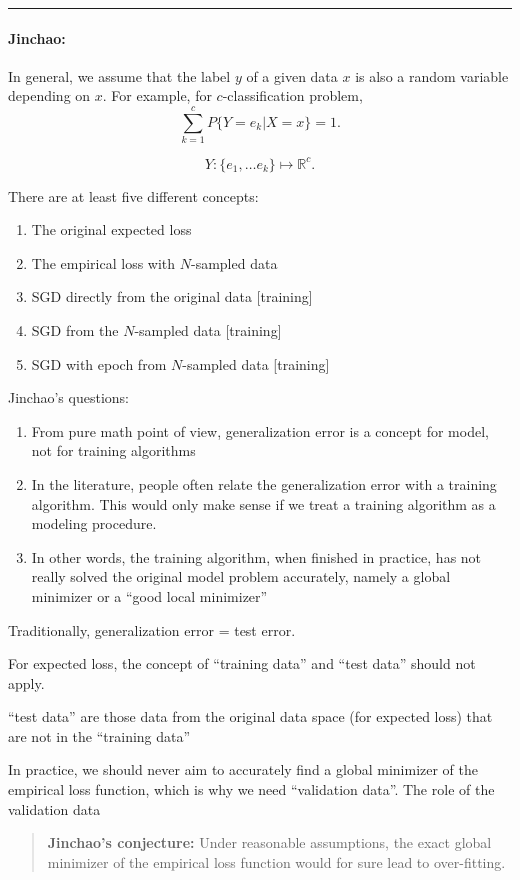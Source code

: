 \hrule
\paragraph{Jinchao:}  In general, we assume that the label $y$  of a given
data $x$ is also a random variable depending on $x$.  For example, for
$c$-classification problem, 
$$
\sum_{k=1}^cP\{Y=e_k | X=x\}=1.
$$

$$
Y: \{e_1,\ldots e_k\}\mapsto \mathbb R^c.
$$

There are at least five different concepts:
\begin{enumerate}
\item The original expected loss
\item The empirical loss with $N$-sampled data
\item SGD directly from the original data [training]
\item SGD from the $N$-sampled data [training]
\item SGD with epoch from $N$-sampled data [training]
\end{enumerate}

Jinchao's questions:
\begin{enumerate}
\item From pure math point of view, generalization error is a concept
  for model, not for training algorithms
\item In the literature, people often relate the generalization error
  with a training algorithm.   This would only make sense if we treat
  a training algorithm as a modeling procedure. 
\item In other words, the training algorithm, when finished in
  practice, has not really solved the original model problem
  accurately, namely a global minimizer or a ``good local minimizer''
\end{enumerate}

Traditionally, generalization error = test error. 

For expected loss, the concept of ``training data'' and ``test data''
should not apply. 

``test data'' are those data from the original data space (for
expected loss) that are not in the ``training data''

In practice, we should never aim to accurately find a global minimizer
of the empirical loss function, which is why we need ``validation
data''.  The role of the validation data 


\begin{quote}
{\bf Jinchao's conjecture:}  Under reasonable assumptions, the exact
global minimizer of the empirical loss function would for sure lead to
over-fitting. 
\end{quote}

